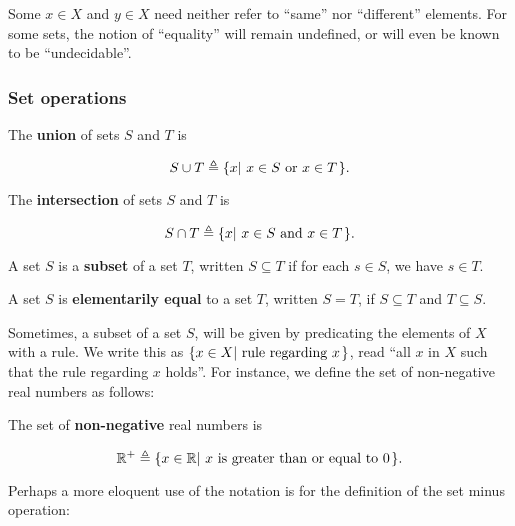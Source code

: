 \begin{remark} Some $x\in X$ and $y\in X$ need neither refer to ``same''
nor ``different'' elements. For some sets, the notion of ``equality'' will
remain undefined, or will even be known to be ``undecidable''. \end{remark}

\subsubsection{Set operations}

\begin{definition} The \textbf{union} of sets $S$ and $T$ is

$$S\cup T\triangleq \mathopen{}\left\{{x\mathopen{}\left|\ {\text{$x\in S$ or $x\in T$}}\right.\mathclose{}}\right\}\mathclose{}.$$

\end{definition}

\begin{definition} The \textbf{intersection} of sets $S$ and $T$ is

$$S\cap T\triangleq \mathopen{}\left\{{x\mathopen{}\left|\ {\text{$x\in S$ and $x\in T$}}\right.\mathclose{}}\right\}\mathclose{}.$$

\end{definition}

\begin{definition} A set $S$ is a \textbf{subset} of a set $T$, written
$S\subseteq T$ if for each $s\in S$, we have $s\in T$. \end{definition}

\begin{definition} A set $S$ is \textbf{elementarily equal} to a set $T$,
written $S=T$, if $S\subseteq T$ and $T\subseteq S$. \end{definition} 

Sometimes, a subset of a set $S$, will be given by predicating the elements of
$X$ with a rule. We write this as $\mathopen{}\left\{{x\in X\mathopen{}\left|\ {\text{rule regarding $x$}}\right.\mathclose{}}\right\}\mathclose{}$,
read ``all $x$ in $X$ such that the rule regarding $x$ holds''. For instance,
we define the set of non-negative real numbers as follows:

\begin{definition} The set of \textbf{non-negative} real numbers is

$$\mathbb{R}^+ \triangleq \mathopen{}\left\{{ x\in\mathbb{R} \mathopen{}\left|\ {\text{$x$ is greater than or
equal to $0$}}\right.\mathclose{}}\right\}\mathclose{}.$$

\end{definition}

Perhaps a more eloquent use of the notation is for the definition of the set
minus operation:


